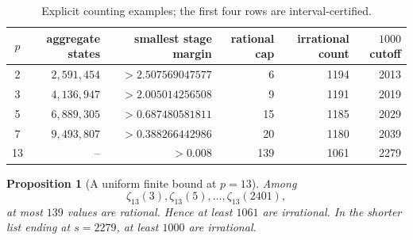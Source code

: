 \documentclass[11pt]{article}
\newtheorem{proposition}[proposition]{Proposition}
\theoremstyle{definition}
\theoremstyle{remark}
\begin{document}
\begin{table}[ht]
\centering
\caption{Explicit counting examples; the first four rows are interval-certified.}
\label{tab:counts}
\begin{tabular}{@{}crrrrr@{}}
\toprule
$p$&aggregate states&smallest stage margin&rational cap&irrational count&$1000$ cutoff\\
\midrule
2&$2{,}591{,}454$&$>2.507569047577$&6&1194&2013\\
3&$4{,}136{,}947$&$>2.005014256508$&9&1191&2019\\
5&$6{,}889{,}305$&$>0.687480581811$&15&1185&2029\\
7&$9{,}493{,}807$&$>0.388266442986$&20&1180&2039\\
13&--&$>0.008$&139&1061&2279\\
\bottomrule
\end{tabular}
\end{table}

\begin{proposition}[A uniform finite bound at $p=13$]\label{prop:p13-finite}
Among
\[
 \zeta_{13}(3),\zeta_{13}(5),\ldots,\zeta_{13}(2401),
\]
at most $139$ values are rational.  Hence at least $1061$ are irrational.  In
the shorter list ending at $s=2279$, at least $1000$ are irrational.
\end{proposition}
\end{document}
